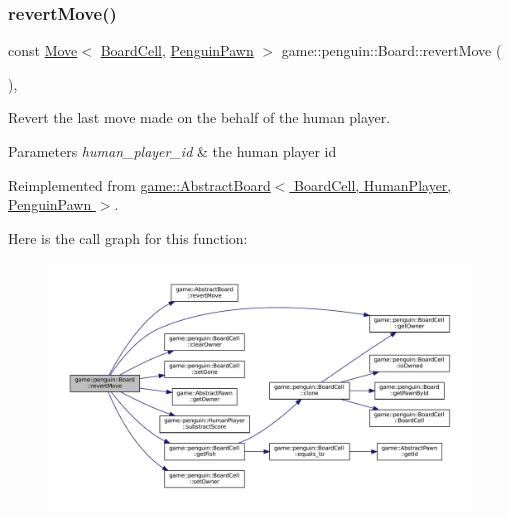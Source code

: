 \subsubsection{\texorpdfstring{revert\+Move()}{revertMove()}}
{\footnotesize\ttfamily const \hyperlink{structgame_1_1_move}{Move}$<$ \hyperlink{classgame_1_1penguin_1_1_board_cell}{Board\+Cell}, \hyperlink{classgame_1_1penguin_1_1_penguin_pawn}{Penguin\+Pawn} $>$ game\+::penguin\+::\+Board\+::revert\+Move (\begin{DoxyParamCaption}{ }\end{DoxyParamCaption})\hspace{0.3cm}{\ttfamily [override]}, {\ttfamily [virtual]}}



Revert the last move made on the behalf of the human player. 


\begin{DoxyParams}{Parameters}
{\em human\+\_\+player\+\_\+id} & the human player id \\
\hline
\end{DoxyParams}


Reimplemented from \hyperlink{classgame_1_1_abstract_board_acc2d5fac68ec019e42fe166b727b7299}{game\+::\+Abstract\+Board$<$ Board\+Cell, Human\+Player, Penguin\+Pawn $>$}.

Here is the call graph for this function\+:
\nopagebreak
\begin{figure}[H]
\begin{center}
\leavevmode
\includegraphics[width=350pt]{classgame_1_1penguin_1_1_board_a45ecb5bba50b4d03592ac4ddf9255b49_cgraph}
\end{center}
\end{figure}
\mbox{\label{classgame_1_1penguin_1_1_board_a7636e3bdb2da72d2a6395b1a2d846394}} 
